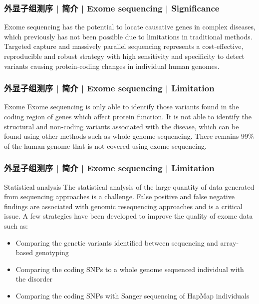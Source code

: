 \begin{frame}
  \frametitle{外显子组测序 | 简介 | Exome sequencing | Significance}
  Exome sequencing has the potential to locate causative genes in complex diseases, which previously has not been possible due to limitations in traditional methods.\\
  \vspace{1em}
  Targeted capture and massively parallel sequencing represents a cost-effective, reproducible and robust strategy with high sensitivity and specificity to detect variants causing protein-coding changes in individual human genomes.
\end{frame}

\begin{frame}
  \frametitle{外显子组测序 | 简介 | Exome sequencing | Limitation}
  \begin{block}{Exome}
 Exome sequencing is only able to identify those variants found in the coding region of genes which affect protein function. It is not able to identify the structural and non-coding variants associated with the disease, which can be found using other methods such as whole genome sequencing. There remains 99\% of the human genome that is not covered using exome sequencing. 
  \end{block}
\end{frame}

\begin{frame}
  \frametitle{外显子组测序 | 简介 | Exome sequencing | Limitation}
  \begin{block}{Statistical analysis}
    The statistical analysis of the large quantity of data generated from sequencing approaches is a challenge. False positive and false negative findings are associated with genomic resequencing approaches and is a critical issue. A few strategies have been developed to improve the quality of exome data such as:
    \begin{itemize}
      \item Comparing the genetic variants identified between sequencing and array-based genotyping
      \item Comparing the coding SNPs to a whole genome sequenced individual with the disorder
      \item Comparing the coding SNPs with Sanger sequencing of HapMap individuals
    \end{itemize}
  \end{block}
\end{frame}

